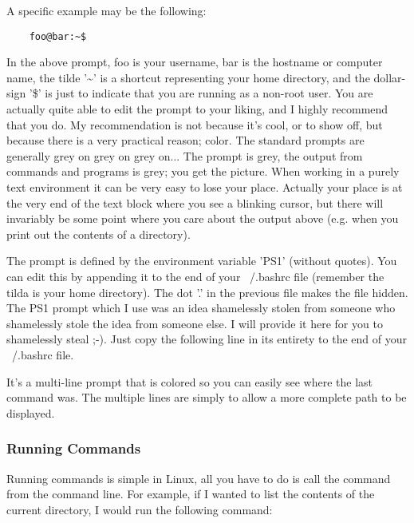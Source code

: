 A specific example may be the following:
	
	\begin{lstlisting}
	foo@bar:~$
	\end{lstlisting}
	
In the above prompt, foo is your username, bar is the hostname or computer name, the tilde '\textasciitilde'  is a shortcut representing your home directory, and the dollar-sign '\$' is just to indicate that you are running as a non-root user.  You are actually quite able to edit the prompt to your liking, and I highly recommend that you do.  My recommendation is not because it's cool, or to show off, but because there is a very practical reason; color.  The standard prompts are generally grey on grey on grey on...  The prompt is grey, the output from commands and programs is grey; you get the picture.  When working in a purely text environment it can be very easy to lose your place.  Actually your place is at the very end of the text block where you see a blinking cursor, but there will invariably be some point where you care about the output above (e.g. when you print out the contents of a directory).

The prompt is defined by the environment variable 'PS1' (without quotes).  You can edit this by appending it to the end of your ~/.bashrc file (remember the tilda is your home directory).  The dot '.' in the previous file makes the file hidden.  The PS1 prompt which I use was an idea shamelessly stolen from someone who shamelessly stole the idea from someone else.  I will provide it here for you to shamelessly steal ;-).  Just copy the following line in its entirety to the end of your ~/.bashrc file.

	
It's a multi-line prompt that is colored so you can easily see where the last command was.  The multiple lines are simply to allow a more complete path to be displayed.


\subsubsection{Running Commands}
\mdseries \noindent Running commands is simple in Linux, all you have to do is call the command from the command line.  For example, if I wanted to list the contents of the current directory, I would run the following command:

